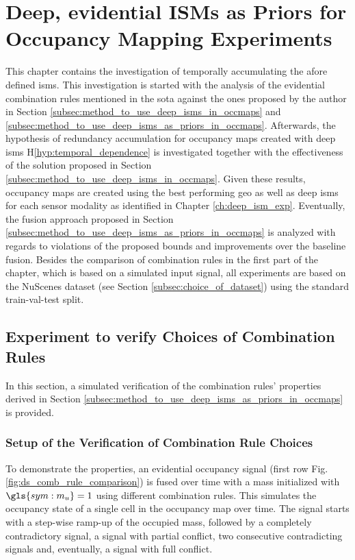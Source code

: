 \chapter{Deep, evidential ISMs as Priors for Occupancy Mapping Experiments}
\label{ch:deep_ev_isms_as_prior_for_occmaps_exp}
This chapter contains the investigation of temporally accumulating the afore defined \gls{ism}s. This investigation is started with the analysis of the evidential combination rules mentioned in the \gls{sota} against the ones proposed by the author in Section \ref{subsec:method_to_use_deep_isms_in_occmaps} and \ref{subsec:method_to_use_deep_isms_as_priors_in_occmaps}. Afterwards, the hypothesis of redundancy accumulation for occupancy maps created with deep \gls{ism}s H\ref{hyp:temporal_dependence} is investigated together with the effectiveness of the solution proposed in Section \ref{subsec:method_to_use_deep_isms_in_occmaps}. Given these results, occupancy maps are created using the best performing geo as well as deep \gls{ism}s for each sensor modality as identified in Chapter \ref{ch:deep_ism_exp}. Eventually, the fusion approach proposed in Section \ref{subsec:method_to_use_deep_isms_as_priors_in_occmaps} is analyzed with regards to violations of the proposed bounds and improvements over the baseline fusion. Besides the comparison of combination rules in the first part of the chapter, which is based on a simulated input signal, all experiments are based on the NuScenes dataset (see Section \ref{subsec:choice_of_dataset}) using the standard train-val-test split.
%
\section{Experiment to verify Choices of Combination Rules}
\label{sec:exp_choice_comb_rule}
In this section, a simulated verification of the combination rules' properties derived in Section \ref{subsec:method_to_use_deep_isms_as_priors_in_occmaps} is provided.
%
\subsection{Setup of the Verification of Combination Rule Choices}
\label{subsec:setup_choice_comb_rule}
To demonstrate the properties, an evidential occupancy signal (first row Fig. \ref{fig:ds_comb_rule_comparison}) is fused over time with a mass initialized with $\gls{sym:m_u} = 1$ using different combination rules. This simulates the occupancy state of a single cell in the occupancy map over time. The signal starts with a step-wise ramp-up of the occupied mass, followed by a completely contradictory signal, a signal with partial conflict, two consecutive contradicting signals and, eventually, a signal with full conflict.
%
